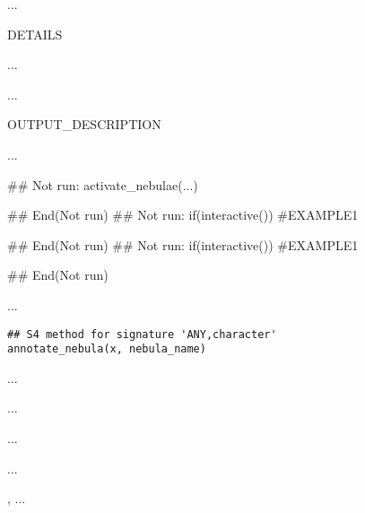 \documentclass[letterpaper]{book}
\begin{document}
%
\begin{Details}\relax
...

DETAILS

...
\end{Details}
%
\begin{Value}
...

OUTPUT\_DESCRIPTION

...
\end{Value}
%
\begin{SeeAlso}\relax
{}
\end{SeeAlso}
%
\begin{Examples}
\begin{ExampleCode}
## Not run: 
activate_nebulae(...)

## End(Not run)
## Not run: 
if(interactive()){
 #EXAMPLE1
 }

## End(Not run)
## Not run: 
if(interactive()){
 #EXAMPLE1
 }

## End(Not run)
\end{ExampleCode}
\end{Examples}
%
\begin{Description}\relax
...
\end{Description}
%
\begin{Usage}
\begin{verbatim}
## S4 method for signature 'ANY,character'
annotate_nebula(x, nebula_name)
\end{verbatim}
\end{Usage}
%
\begin{Arguments}
\begin{ldescription}
\item[\code{x}] ...

\item[\code{nebula\_name}] ...
\end{ldescription}
\end{Arguments}
%
\begin{Details}\relax
...
\end{Details}
%
\begin{Value}
...
\end{Value}
%
\begin{SeeAlso}\relax
{}, ...
\end{SeeAlso}
\end{document}
